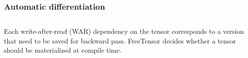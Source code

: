 \documentclass[12pt,aspectratio=169]{beamer}
\begin{document}
    \begin{frame}
        \frametitle{Automatic differentiation}

        \begin{columns}
            \begin{column}{0.55\textwidth}
                Each write-after-read (WAR) dependency on the tensor corresponds to a version that need to be saved for
                backward pass. FreeTensor decides whether a tensor should be materialized at compile time.
            \end{column}
        \end{columns}
    \end{frame}
\end{document}

